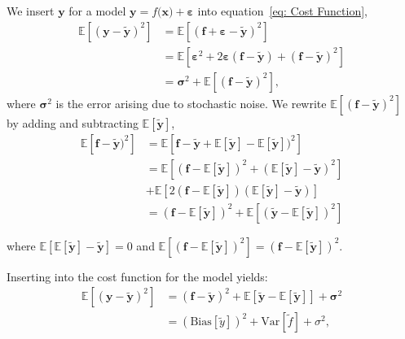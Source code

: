 \documentclass[reprint,english,notitlepage]{revtex4-1}  %
\begin{document}
We insert $\boldsymbol{y}$ for a model $\boldsymbol{y} = f(\boldsymbol{x) + \boldsymbol{\varepsilon}}$ into equation~\ref{eq: Cost Function}, 
\begin{align*}
    \mathbb{E}[(\boldsymbol{y} - \boldsymbol{\tilde{y}})^2] 
    & = \mathbb{E}[(\boldsymbol{f} + \boldsymbol{\varepsilon} - \boldsymbol{\tilde{y}})^2] \\ 
    & = \mathbb{E}[\boldsymbol{\varepsilon}^2 + 2\boldsymbol{\varepsilon}(\boldsymbol{f} - \boldsymbol{\tilde{y}}) + (\boldsymbol{f} - \boldsymbol{\tilde{y}})^2] \\ 
    & = \boldsymbol{\sigma}^2 + \mathbb{E}[(\boldsymbol{f} - \boldsymbol{\tilde{y}})^2], 
\end{align*}
where $\boldsymbol{\sigma}^2$ is the error arising due to stochastic noise. 
We rewrite $\mathbb{E}[(\boldsymbol{f} - \boldsymbol{\tilde{y}})^2]$ by adding and subtracting $\mathbb{E}[\boldsymbol{\tilde{y}}]$, 
\begin{align*}
    \mathbb{E}[\boldsymbol{f} - \boldsymbol{\tilde{y}})^2] 
    & = \mathbb{E}[\boldsymbol{f} - \boldsymbol{\tilde{y}} + \mathbb{E}[\boldsymbol{\tilde{y}}] - \mathbb{E}[\boldsymbol{\tilde{y}}])^2] \\ 
    & = \mathbb{E}[(\boldsymbol{f} - \mathbb{E}[\boldsymbol{\tilde{y}}])^2 
        + (\mathbb{E}[\boldsymbol{\tilde{y}}] - \boldsymbol{\tilde{y}})^2] \\
        &+ \mathbb{E}[2(\boldsymbol{f} - \mathbb{E}[\boldsymbol{\tilde{y}}])
            (\mathbb{E}[\boldsymbol{\tilde{y}}] - \boldsymbol{\tilde{y}})] \\ 
    & = (\boldsymbol{f} - \mathbb{E}[\boldsymbol{\tilde{y}}])^2 
        + \mathbb{E}[(\boldsymbol{\tilde{y}} - \mathbb{E}[\boldsymbol{\tilde{y}}])^2]
\end{align*}

where $\mathbb{E}[\mathbb{E}[\boldsymbol{\tilde{y}}] - \boldsymbol{\tilde{y}}] = 0$ and $\mathbb{E}[(\boldsymbol{f} - \mathbb{E}[\boldsymbol{\tilde{y}}])^2] = (\boldsymbol{f} - \mathbb{E}[\boldsymbol{\tilde{y}}])^2$. 

Inserting into the cost function for the model yields: 
\begin{align}
    \mathbb{E}[(\boldsymbol{y} - \boldsymbol{\tilde{y}})^2] 
    &= (\boldsymbol{f} - \mathbb{\boldsymbol{\tilde{y}}})^2 
        + \mathbb{E}[\boldsymbol{\tilde{y}} 
        - \mathbb{E}[\boldsymbol{\tilde{y}}]] 
        + \boldsymbol{\sigma}^2 \nonumber \\ 
    &= (\text{Bias}[\tilde{y}])^2 
        + \text{Var}[\tilde{f}] 
        + \sigma^2, 
\end{align}
\end{document}
